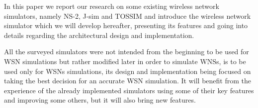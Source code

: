 In this paper we report our research on some existing wireless network
simulators, namely NS-2, J-sim and TOSSIM and introduce \codename the 
wireless network simulator which we will develop hereafter, presenting its 
features and going into details regarding the architectural design and implementation.

All the surveyed simulators were not intended from the beginning to be
used for WSN simulations but rather modified later in order to simulate WNSs, 
\codename is to be used only 
for WSNs simulations, its design and
implementation being focused on taking the best decision for an accurate WSN
simulation. It will benefit from the experience of the already implemented
simulators using some of their key features and improving some others, but
it will also bring new features.

